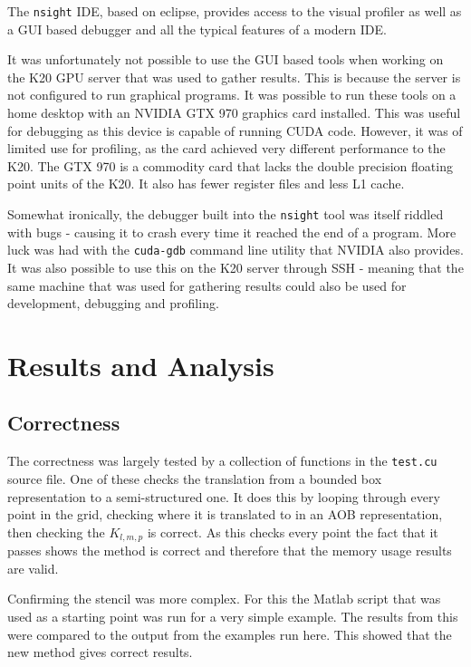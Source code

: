 \documentclass[12pt,a4paper]{report}
\begin{document}
The \verb|nsight| IDE, based on eclipse, provides access to the visual profiler as well as a GUI based debugger and all the typical features of a modern IDE.

It was unfortunately not possible to use the GUI based tools when working on the K20 GPU server that was used to gather results. This is because the server is not configured to run graphical programs. It was possible to run these tools on a home desktop with an NVIDIA GTX 970 graphics card installed. This was useful for debugging as this device is capable of running CUDA code. However, it was of limited use for profiling, as the card achieved very different performance to the K20. The GTX 970 is a commodity card that lacks the double precision floating point units of the K20. It also has fewer register files and less L1 cache.

Somewhat ironically, the debugger built into the \verb|nsight| tool was itself riddled with bugs - causing it to crash every time it reached the end of a program. More luck was had with the \verb|cuda-gdb| command line utility that NVIDIA also provides. It was also possible to use this on the K20 server through SSH - meaning that the same machine that was used for gathering results could also be used for development, debugging and profiling. 

\chapter{Results and Analysis}
\label{chapter:results}

\section{Correctness}

The correctness was largely tested by a collection of functions in the \verb|test.cu| source file. One of these checks the translation from a bounded box representation to a semi-structured one. It does this by looping through every point in the grid, checking where it is translated to in an AOB representation, then checking the $K_{l,m,p}$ is correct. As this checks every point the fact that it passes shows the method is correct and therefore that the memory usage results are valid.

Confirming the stencil was more complex. For this the Matlab script that was used as a starting point was run for a very simple example. The results from this were compared to the output from the examples run here. This showed that the new method gives correct results.
\end{document}
